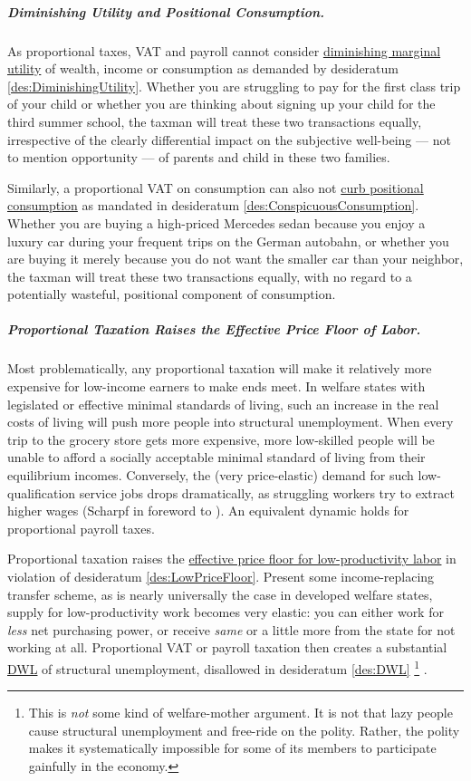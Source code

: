 \subparagraph{Diminishing Utility and Positional Consumption.} As proportional taxes, VAT and payroll cannot consider \hyperref[des:DiminishingUtility]{diminishing marginal utility} of wealth, income or consumption as demanded by desideratum \ref{des:DiminishingUtility}.
Whether you are struggling to pay for the first class trip of your child or whether you are thinking about signing up your child for the third summer school, the taxman will treat these two transactions equally, irrespective of the clearly differential impact on the subjective well-being --- not to mention opportunity --- of parents and child in these two families.

Similarly, a proportional VAT on consumption can also not \hyperref[des:ConspicuousConsumption]{curb positional consumption} as mandated in desideratum \ref{des:ConspicuousConsumption}.
Whether you are buying a high-priced Mercedes sedan because you enjoy a luxury car during your frequent trips on the German autobahn, or whether you are buying it merely because you do not want the smaller car than your neighbor, the taxman will treat these two transactions equally, with no regard to a potentially wasteful, positional component of consumption.

\subparagraph{Proportional Taxation Raises the Effective Price Floor of Labor.}  \label{sec:PropTaxDWL} Most problematically, any proportional taxation will make it relatively more expensive for low-income earners to make ends meet.
In welfare states with legislated or effective minimal standards of living, such an increase in the real costs of living will push more people into structural unemployment.
When every trip to the grocery store gets more expensive, more low-skilled people will be unable to afford a socially acceptable minimal standard of living from their equilibrium incomes.
Conversely, the (very price-elastic) demand for such low-qualification service jobs drops dramatically, as struggling workers try to extract higher wages (Scharpf in foreword to \citealt[12ff]{Ganghof2004}).
An equivalent dynamic holds for proportional payroll taxes.

Proportional taxation raises the \hyperref[des:LowPriceFloor]{effective price floor for low-productivity labor} in violation of desideratum \ref{des:LowPriceFloor}.
Present some income-replacing transfer scheme, as is nearly universally the case in developed welfare states, supply for low-productivity work becomes very elastic:
you can either work for \emph{less} net purchasing power, or receive \emph{same} or a little more from the state for not working at all.
Proportional VAT or payroll taxation then creates a substantial \hyperref[des:DWL]{DWL} of structural unemployment, disallowed in desideratum \ref{des:DWL}
\footnote{
	This is \emph{not} some kind of welfare-mother argument.
	It is not that lazy people cause structural unemployment and free-ride on the polity.
	Rather, the polity makes it systematically impossible for some of its members to participate gainfully in the economy.
}
.

